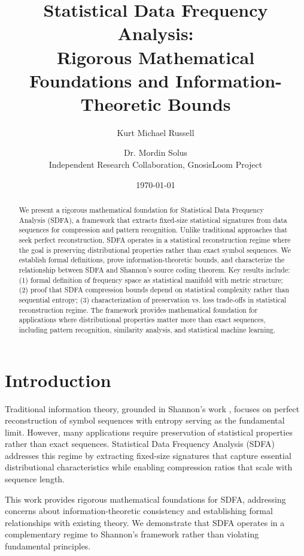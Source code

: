 \documentclass[11pt]{article}
\title{Statistical Data Frequency Analysis: \\
Rigorous Mathematical Foundations and Information-Theoretic Bounds}
\author{Kurt Michael Russell \and Dr. Mordin Solus \\
Independent Research Collaboration, GnosisLoom Project}
\date{\today}
\newcommand{\sdfa}{\textsc{SDFA}}
\begin{document}
\maketitle

\begin{abstract}
We present a rigorous mathematical foundation for Statistical Data Frequency Analysis (\sdfa), a framework that extracts fixed-size statistical signatures from data sequences for compression and pattern recognition. Unlike traditional approaches that seek perfect reconstruction, \sdfa{} operates in a statistical reconstruction regime where the goal is preserving distributional properties rather than exact symbol sequences. We establish formal definitions, prove information-theoretic bounds, and characterize the relationship between \sdfa{} and Shannon's source coding theorem. Key results include: (1) formal definition of frequency space as statistical manifold with metric structure; (2) proof that \sdfa{} compression bounds depend on statistical complexity rather than sequential entropy; (3) characterization of preservation vs. loss trade-offs in statistical reconstruction regime. The framework provides mathematical foundation for applications where distributional properties matter more than exact sequences, including pattern recognition, similarity analysis, and statistical machine learning.
\end{abstract}

\section{Introduction}

Traditional information theory, grounded in Shannon's work \cite{shannon1948}, focuses on perfect reconstruction of symbol sequences with entropy serving as the fundamental limit. However, many applications require preservation of statistical properties rather than exact sequences. Statistical Data Frequency Analysis (\sdfa) addresses this regime by extracting fixed-size signatures that capture essential distributional characteristics while enabling compression ratios that scale with sequence length.

This work provides rigorous mathematical foundations for \sdfa, addressing concerns about information-theoretic consistency and establishing formal relationships with existing theory. We demonstrate that \sdfa{} operates in a complementary regime to Shannon's framework rather than violating fundamental principles.
\end{document}
